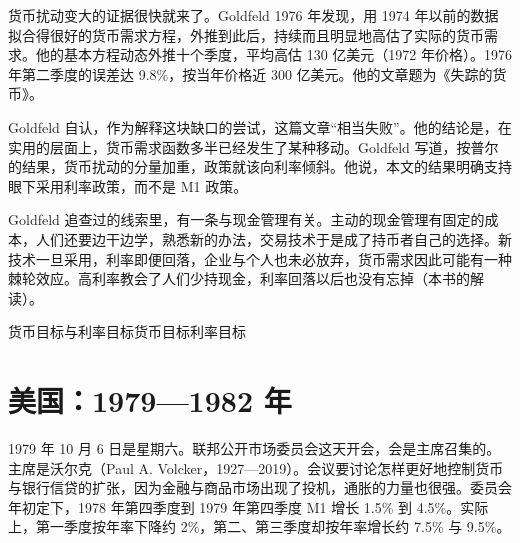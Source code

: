 货币扰动变大的证据很快就来了。Goldfeld 1976 年发现，用 1974 年以前的数据拟合得很好的货币需求方程，外推到此后，持续而且明显地高估了实际的货币需求\cite{goldfeld1976}。他的基本方程动态外推十个季度，平均高估 130 亿美元（1972 年价格）\cite{goldfeld1976}。1976 年第二季度的误差达 9.8\%，按当年价格近 300 亿美元\cite{goldfeld1976}。他的文章题为《失踪的货币》\cite{goldfeld1976}。

Goldfeld 自认，作为解释这块缺口的尝试，这篇文章“相当失败”\cite{goldfeld1976}。他的结论是，在实用的层面上，货币需求函数多半已经发生了某种移动\cite{goldfeld1976}。Goldfeld 写道，按普尔的结果，货币扰动的分量加重，政策就该向利率倾斜\cite{goldfeld1976}。他说，本文的结果明确支持眼下采用利率政策，而不是 M1 政策\cite{goldfeld1976}。

Goldfeld 追查过的线索里，有一条与现金管理有关。主动的现金管理有固定的成本，人们还要边干边学，熟悉新的办法，交易技术于是成了持币者自己的选择\cite{goldfeld1976}。新技术一旦采用，利率即便回落，企业与个人也未必放弃，货币需求因此可能有一种棘轮效应\cite{goldfeld1976}。高利率教会了人们少持现金，利率回落以后也没有忘掉（本书的解读）。

\begin{compare}{货币目标与利率目标}{货币目标}{利率目标}
\end{compare}

\section{美国：1979—1982 年}\label{sec:monetarism-us}

1979 年 10 月 6 日是星期六。联邦公开市场委员会这天开会，会是主席召集的\cite{fomc1979,loc45}。主席是沃尔克（Paul A. Volcker，1927—2019）\cite{fomc1979,loc45,gnd45}。会议要讨论怎样更好地控制货币与银行信贷的扩张，因为金融与商品市场出现了投机，通胀的力量也很强\cite{fomc1979}。委员会年初定下，1978 年第四季度到 1979 年第四季度 M1 增长 1.5\% 到 4.5\%\cite{fomc1979}。实际上，第一季度按年率下降约 2\%，第二、第三季度却按年率增长约 7.5\% 与 9.5\%\cite{fomc1979}。

